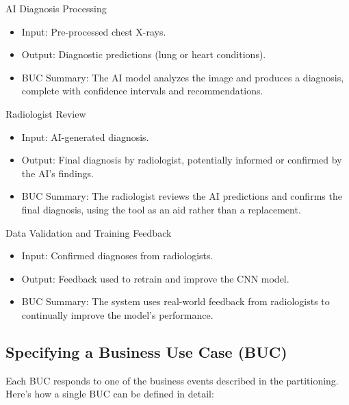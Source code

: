 \documentclass[12pt]{article}
\begin{document}
AI Diagnosis Processing
\begin{itemize}
    \item Input: Pre-processed chest X-rays.
    \item Output: Diagnostic predictions (lung or heart conditions).
    \item BUC Summary: The AI model analyzes the image and produces a diagnosis, complete with 
        confidence intervals and recommendations.
\end{itemize}

Radiologist Review
\begin{itemize}
    \item Input: AI-generated diagnosis.
    \item Output: Final diagnosis by radiologist, potentially informed or confirmed by the AI’s 
        findings.
    \item BUC Summary: The radiologist reviews the AI predictions and confirms the final 
        diagnosis, using the tool as an aid rather than a replacement.
\end{itemize}

Data Validation and Training Feedback
\begin{itemize}
    \item Input: Confirmed diagnoses from radiologists.
    \item Output: Feedback used to retrain and improve the CNN model.
    \item BUC Summary: The system uses real-world feedback from radiologists to continually 
        improve the model’s performance.
\end{itemize}

\subsection{Specifying a Business Use Case (BUC)}
Each BUC responds to one of the business events described in the partitioning. Here’s how a single 
BUC can be defined in detail:
\end{document}
